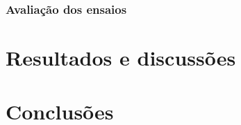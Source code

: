 \documentclass[
	12pt,				%
	openright,			%
	oneside,			%
	a4paper,			%
	english,			%
	french,				%
	spanish,			%
	brazil,				%
	oldfontcommands
	]{abntex2}
\begin{document}
\subsection[Avaliação dos ensaios]{Avaliação dos ensaios}

\chapter[Resultados e discussões]{Resultados e discussões}




\chapter[Conclusões]{Conclusões} \label{ultimo_capitulo}



\end{document}
